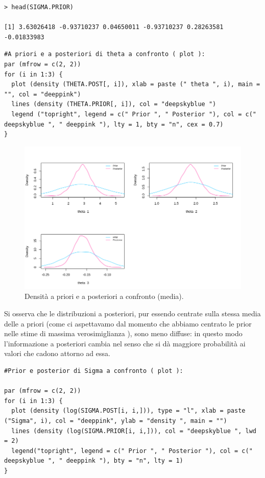 {
\color{red}
\begin{Verbatim}
> head(SIGMA.PRIOR)

[1] 3.63026418 -0.93710237 0.04650011 -0.93710237 0.28263581 -0.01833983
\end{Verbatim}
}

\begin{lstlisting}[style=R]
#A priori e a posteriori di theta a confronto ( plot ):
par (mfrow = c(2, 2))
for (i in 1:3) {
  plot (density (THETA.POST[, i]), xlab = paste (" theta ", i), main = "", col = "deeppink")
  lines (density (THETA.PRIOR[, i]), col = "deepskyblue ")
  legend ("topright", legend = c(" Prior ", " Posterior "), col = c(" deepskyblue ", " deeppink "), lty = 1, bty = "n", cex = 0.7)
}
\end{lstlisting}

\begin{figure}
    \centering
    \includegraphics[totalheight=8.5cm]{img/esercizio11-2-3.png}
    \caption{  Densità a priori e a posteriori a confronto (media).}
\end{figure}

Si osserva che le distribuzioni a posteriori, pur essendo centrate sulla stessa 
media delle a priori (come ci aspettavamo dal momento che abbiamo centrato le 
prior nelle stime di massima verosimiglianza ), sono meno diffuse: 
in questo modo l'informazione a posteriori cambia nel senso che si dà maggiore 
probabilità ai valori che cadono attorno ad essa.

\begin{lstlisting}[style=R]
#Prior e posterior di Sigma a confronto ( plot ):

par (mfrow = c(2, 2))
for (i in 1:3) {
  plot (density (log(SIGMA.POST[i, i,])), type = "l", xlab = paste ("Sigma", i), col = "deeppink", ylab = "density ", main = "")
  lines (density (log(SIGMA.PRIOR[i, i,])), col = "deepskyblue ", lwd = 2)
  legend("topright", legend = c(" Prior ", " Posterior "), col = c(" deepskyblue ", " deeppink "), bty = "n", lty = 1)
}
\end{lstlisting}

